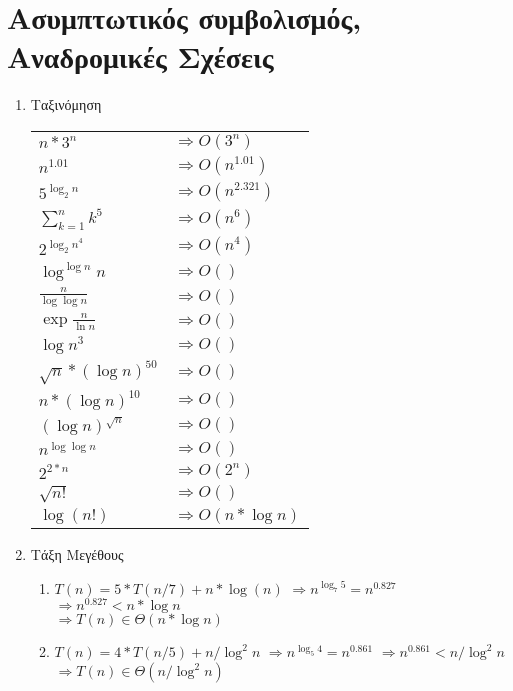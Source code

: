 \documentclass[a4paper,10pt]{article} \usepackage{anysize}
\begin{document}
\renewcommand{\labelenumi}{\alph{enumi}}
\renewcommand{\labelenumii}{(\roman{enumii})}



\section{Ασυμπτωτικός συμβολισμός, Αναδρομικές
Σχέσεις} \setcounter{section}{1}
\begin{enumerate}
\item Ταξινόμηση\\
\begin{tabular}{l l}
$ n*3^n$ & $\Rightarrow O(3^n)$ \\
$ n^{1.01}$ & $\Rightarrow O(n^{1.01})$\\
$ 5^{\log _2 {n}}$ & $\Rightarrow O(n^{2.321})$\\
$ \sum_{k=1}^{n}k^5$ & $\Rightarrow O(n^6)$\\
$ 2^{{\log _2 {n}}^4}$ & $\Rightarrow O(n^4)$\\
$ {\log^{\log{n}}{n}}$ & $\Rightarrow O()$\\
$ \frac{n}{\log\log{n}}$ & $\Rightarrow O()$\\
$ \exp{\frac{n}{\ln{n}}}$ & $\Rightarrow O()$\\
$ \log{n^3}$ & $\Rightarrow O()$\\
$ \sqrt{n}*(\log{n})^{50}$ & $\Rightarrow O()$\\
$ n*(\log{n})^{10}$ & $\Rightarrow O()$\\
$ (\log{n})^{\sqrt{n}}$ & $\Rightarrow O()$\\
$ n^{\log{\log{n}}}$ & $\Rightarrow O()$\\
$ 2^{2*n}$ & $\Rightarrow O(2^{n})$\\
$ \sqrt{n!}$ & $\Rightarrow O()$\\
$ \log{(n!)}$ & $\Rightarrow O(n*\log{n})$\\

\end{tabular}

\item Τάξη Μεγέθους
\begin{enumerate}
\item $T(n)=5*T(n/7)+n*\log(n)$
$\Rightarrow n^{\log _7 {5}} = n^{0.827}$
$\Rightarrow n^{0.827} < n*\log{n}$\\
$\Rightarrow T(n) \in \Theta(n*\log{n})$

\item $T(n) = 4*T(n/5)+n/\log^2{n}$
$\Rightarrow n^{\log_5 {4}} = n^{0.861}$
$\Rightarrow n^{0.861} < n/\log^2{n}$\\
$\Rightarrow T(n) \in \Theta(n/\log^2{n})$


\end{enumerate}
\end{enumerate}
\end{document}
